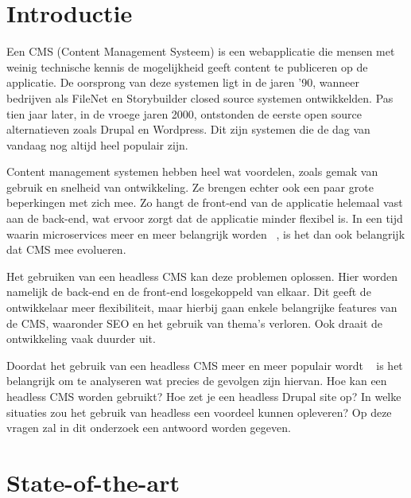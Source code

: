 
\section{Introductie} %
\label{sec:introductie}

Een CMS (Content Management Systeem) is een 
webapplicatie die mensen met weinig technische kennis de mogelijkheid geeft content te publiceren op de applicatie. De oorsprong van deze systemen ligt in de jaren '90, wanneer bedrijven als FileNet en Storybuilder closed source systemen ontwikkelden. Pas tien jaar later, in de vroege jaren 2000, ontstonden de eerste open source alternatieven zoals Drupal en Wordpress. Dit zijn systemen die de dag van vandaag nog altijd heel populair zijn. ~\autocite{Burgy2020}

Content management systemen hebben heel wat voordelen, zoals gemak van gebruik en snelheid van ontwikkeling. Ze brengen echter ook een paar grote beperkingen met zich mee. Zo hangt de front-end van de applicatie helemaal vast aan de back-end, wat ervoor zorgt dat de applicatie minder flexibel is. In een tijd waarin microservices meer en meer belangrijk worden ~\autocite{Shabani2021}, is het dan ook belangrijk dat CMS mee evolueren.

Het gebruiken van een headless CMS kan deze problemen oplossen. Hier worden namelijk de back-end en de front-end losgekoppeld van elkaar. Dit geeft de ontwikkelaar meer flexibiliteit, maar hierbij gaan enkele belangrijke features van de CMS, waaronder SEO en het gebruik van thema's verloren. Ook draait de ontwikkeling vaak duurder uit. ~\autocite{Luksza}

Doordat het gebruik van een headless CMS meer en meer populair wordt ~\autocite{Luksza} is het belangrijk om te analyseren wat precies de gevolgen zijn hiervan. Hoe kan een headless CMS worden gebruikt? Hoe zet je een headless Drupal site op? In welke situaties zou het gebruik van headless een voordeel kunnen opleveren? Op deze vragen zal in dit onderzoek een antwoord worden gegeven.


\section{State-of-the-art}
\label{sec:state-of-the-art}

